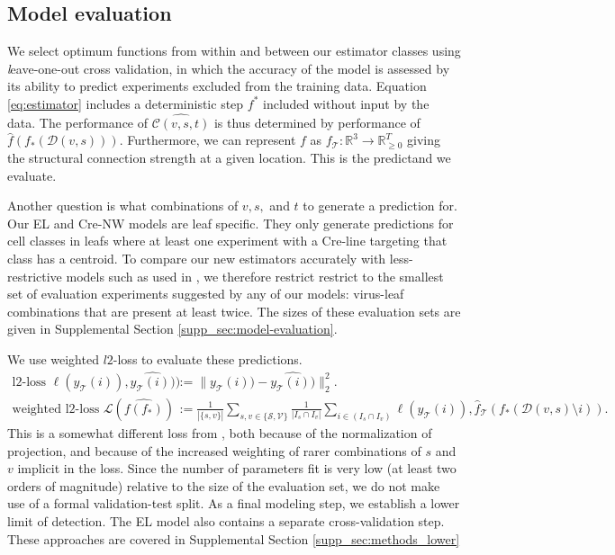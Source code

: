\newpage

\subsection{Model evaluation}

We select optimum functions from within and between our estimator classes using {\textit leave-one-out cross validation}, in which the accuracy of the model is assessed by its ability to predict experiments excluded from the training data. %
Equation \ref{eq:estimator} includes a deterministic step $f^*$ included without input by the data.
The performance of $\widehat {\mathcal C (v,s,t)}$ is thus determined by performance of $\widehat f (f_*(\mathcal D(v,s)))$.
Furthermore, we can represent $f$ as $f_{\mathcal T}: \mathbb R^3 \to \mathbb R_{\geq 0}^T$ giving the structural connection strength at a given location.
This is the predictand we evaluate. 

Another question is what combinations of $v, s, $ and $t$ to generate a prediction for.
Our EL and Cre-NW models are leaf specific.
They only generate predictions for cell classes in leafs where at least one experiment with a Cre-line targeting that class has a centroid.
To compare our new estimators accurately with less-restrictive models such as used in \citet{Knox2019-ot}, we therefore restrict restrict to the smallest set of evaluation experiments suggested by any of our models: virus-leaf combinations that are present at least twice. 
The sizes of these evaluation sets are given in Supplemental Section \ref{supp_sec:model-evaluation}.

We use weighted $l2$-loss to evaluate these predictions.
\begin{align*}
\text{l2-loss } \ell (y_{\mathcal T}(i)),\widehat {y_{\mathcal T}(i))}) &:=   \| y_{\mathcal T} (i)) - \widehat {y_{\mathcal T}(i))} \|_2^2. \\
\text{weighted l2-loss } \mathcal L ( \widehat {f(f_*)}) &:= \frac{1}{|\{s,v\}|} \sum_{s,v \in \{\mathcal S,\mathcal V\}} \frac{1}{ |I_{s} \cap I_v |} \sum_{i \in (I_{s} \cap I_v ) } \ell (y_{\mathcal T}(i)), \hat f_{\mathcal T} (f_*(\mathcal D(v,s) \setminus i)) .
\end{align*}
This is a somewhat different loss from \citet{Knox2019-ot}, both because of the normalization of projection, and because of the increased weighting of rarer combinations of $s$ and $v$ implicit in the loss.
Since the number of parameters fit is very low (at least two orders of magnitude) relative to the size of the evaluation set, we do not make use of a formal validation-test split.  %
As a final modeling step, we establish a lower limit of detection.
The EL model also contains a separate cross-validation step.
These approaches are covered in Supplemental Section \ref{supp_sec:methods_lower}

